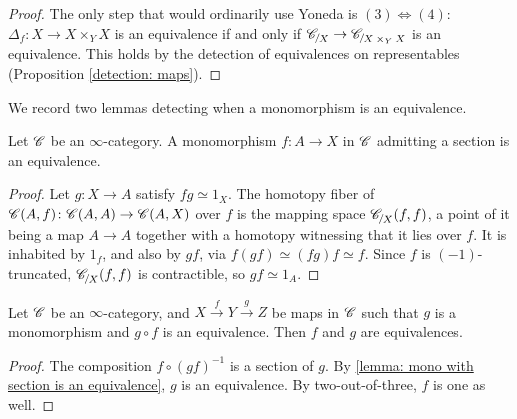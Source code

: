\documentclass[twoside,a4paper,11pt]{amsart}
\begin{document}
\begin{proof}
    The only step that would ordinarily use Yoneda is $(3)\Leftrightarrow(4)$: $\Delta_f\colon X\to X\times_Y X$ is an equivalence if and only if $\slice{\C}{X}\to\slice{\C}{X\times_YX}$ is an equivalence. This holds by the detection of equivalences on representables (Proposition \ref{detection: maps}).
\end{proof}
We record two lemmas detecting when a monomorphism is an equivalence.
\begin{lemma}\label{lemma: mono with section is an equivalence}
    Let $\mathscr{C}$ be an $\infty$-category. A monomorphism $f\colon A\to X$ in $\mathscr{C}$ admitting a section is an equivalence.
\end{lemma}
\begin{proof}
    Let $g\colon X\to A$ satisfy $fg\simeq 1_X$. The homotopy fiber of $\mathscr{C}(A,f)\colon\mathscr{C}(A,A)\to\mathscr{C}(A,X)$ over $f$ is the mapping space $\slice{\C}{X}(f,f)$, a point of it being a map $A\to A$ together with a homotopy witnessing that it lies over $f$. It is inhabited by $1_f$, and also by $gf$, via $f(gf)\simeq(fg)f\simeq f$. Since $f$ is $(-1)$-truncated, $\slice{\C}{X}(f,f)$ is contractible, so $gf\simeq 1_A$.
\end{proof}
\begin{prop}\label{prop: an equivalence that factors with a mono is an equivalence}
    Let $\mathscr{C}$ be an $\infty$-category, and $X\xrightarrow{f}Y\xrightarrow{g}Z$ be maps in $\mathscr{C}$ such that $g$ is a monomorphism and $g\circ f$ is an equivalence. Then $f$ and $g$ are equivalences. 
\end{prop}
\begin{proof}
   The composition $f\circ (gf)^{-1}$ is a section of $g$. By \cref{lemma: mono with section is an equivalence}, $g$ is an equivalence. By two-out-of-three, $f$ is one as well.
\end{proof}
\end{document}

